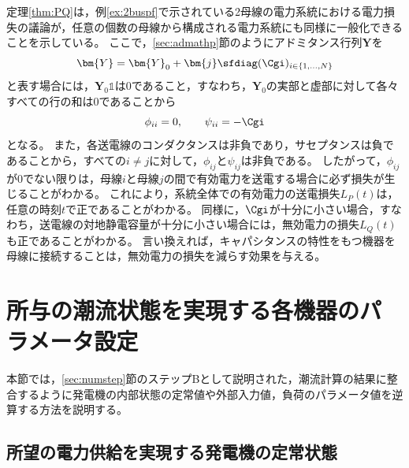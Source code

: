 \documentclass[tombow,dvipdfmx]{corona-a5-1.1}
\begin{document}
定理\ref{thm:PQ}は，例\ref{ex:2buspf}で示されている2母線の電力系統における電力損失の議論が，任意の個数の母線から構成される電力系統にも同様に一般化できることを示している。
ここで，\ref{sec:admathp}節のようにアドミタンス行列$\bm{Y}$を
\[
\bm{Y}=\bm{Y}_0 + \bm{j} \sfdiag(\Cgi)_{i\in \{1,\ldots,N\} }
\]
と表す場合には，$\bm{Y}_0 \mathds{1}$は0であること，すなわち，$\bm{Y}_0$の実部と虚部に対して各々すべての行の和は0であることから
\[
\phi_{ii}=0,\qquad
\psi_{ii}= - \Cgi
\]
となる。
また，各送電線のコンダクタンスは非負であり，サセプタンスは負であることから，すべての$i\neq j$に対して，$\phi_{ij} $と$\psi_{ij}$は非負である。
したがって，$\phi_{ij}$が0でない限りは，母線$i$と母線$j$の間で有効電力を送電する場合に必ず損失が生じることがわかる。
これにより，系統全体での有効電力の送電損失$L_P(t)$は，任意の時刻$t$で正であることがわかる。
同様に，$\Cgi$が十分に小さい場合，すなわち，送電線の対地静電容量が十分に小さい場合には，無効電力の損失$L_Q(t)$も正であることがわかる。
言い換えれば，キャパシタンスの特性をもつ機器を母線に接続することは，無効電力の損失を減らす効果を与える。



\section{所与の潮流状態を実現する各機器のパラメータ設定}\label{sec:paradef}

本節では，\ref{sec:numstep}節のステップBとして説明された，潮流計算の結果に整合するように発電機の内部状態の定常値や外部入力値，負荷のパラメータ値を逆算する方法を説明する。


\subsection{所望の電力供給を実現する発電機の定常状態}\label{sec:stagen}
\end{document}
